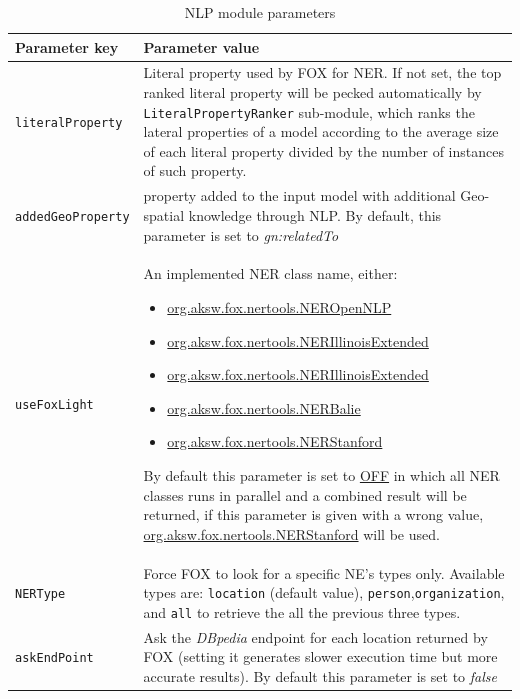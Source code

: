 \documentclass[a4paper,twoside,bibtotoc,abstracton,12pt,BCOR=15mm]{article}
\begin{document}
    \begin{table}
    \caption{NLP module parameters} \label{tbl:nlpPram}
    \small
    \begin{tabularx}{\textwidth}{@{}lX@{}}
    \toprule
    \textbf{Parameter key} 	& \textbf{Parameter value} \\
    \toprule
    \texttt{literalProperty}	& Literal property used by FOX for NER. If not set, the top ranked literal property will be pecked automatically by \texttt{LiteralPropertyRanker} sub-module, which ranks the  lateral properties of a model according to the average size of each literal property divided by the number of instances of such property.\\
    \midrule
    \texttt{addedGeoProperty}& property added to the input model with additional Geo-spatial knowledge through NLP. By default, this parameter is set to \emph{gn:relatedTo\footnotemark[11]}\\
    \midrule
    \texttt{useFoxLight} 	& An implemented NER class name, either: 
			      \begin{itemize}
				  \itemsep-0.5em
				  \item \url{org.aksw.fox.nertools.NEROpenNLP}
				  \item \url{org.aksw.fox.nertools.NERIllinoisExtended}
				  \item \url{org.aksw.fox.nertools.NERIllinoisExtended}
				  \item \url{org.aksw.fox.nertools.NERBalie}
				  \item \url{org.aksw.fox.nertools.NERStanford}
			      \end{itemize}
			      By default this parameter is set to \url{OFF} in which all NER classes runs in parallel and a combined result will be returned, if this parameter is given with a wrong value, \url{org.aksw.fox.nertools.NERStanford} will be used. \\
    \midrule
    \texttt{NERType} 	& Force FOX to look for a specific NE's types only. Available types are: \texttt{location} (default value), \texttt{person},\texttt{organization}, and \texttt{all} to retrieve the all the previous three types.\\ 
    \midrule
    \texttt{askEndPoint} 	& Ask the \emph{DBpedia} endpoint for each location returned by FOX (setting it generates slower execution time but more accurate results). By default this parameter is set to \emph{false}\\

\end{tabularx}
\end{table}
\end{document}
